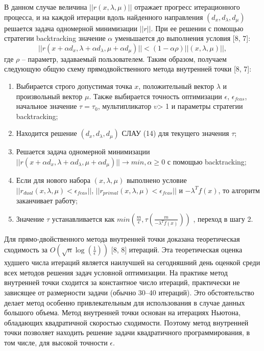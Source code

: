 \documentclass[12pt,a4paper]{article}
\begin{document}
В данном случае величина $||r(x, \lambda, \mu)||$ отражает прогресс итерационного процесса, и на каждой итерации вдоль найденного направления $(d_x, d_\lambda, d_\mu)$ решается задача одномерной минимизации $||r||$. При ее решении с помощью стратегии backtracking значение $\alpha$ уменьшается до выполнения условия [8, 7]:
	\begin{equation}
		||r(x+\alpha d_{x}, \lambda+\alpha d_{\lambda}, \mu+\alpha d_{\mu})|| < (1-\alpha  \rho)||(x,\lambda,\mu)||,
	\end{equation}		
где $\rho$ – параметр, задаваемый пользователем. Таким образом, получаем следующую общую схему прямодвойственного метода внутренней точки [8, 7]:
	\begin{enumerate}
		\item Выбирается строго допустимая точка $x$, положительный вектор $\lambda$ и произвольный вектор $\mu$. Также выбирается точность оптимизации $\epsilon$, $\epsilon_{feas}$, начальное значение $\tau=\tau_0$, мультипликатор $\upsilon$> 1 и параметры
		стратегии backtracking;
		\item Находится решение $(d_x, d_\lambda, d_\mu)$ СЛАУ (14) для текущего значения $\tau$;
		\item Решается задача одномерной минимизации $	||r(x + \alpha d_x, \lambda +\alpha d_\lambda, \mu + \alpha d_\mu)|| \longrightarrow min, \alpha \geq 0$	с помощью backtracking;
		\item  Если для нового набора $(x, \lambda, \mu)$ выполнено условие $||r_{dual} (x, \lambda, \mu) < \epsilon_{feas}||$, $||r_{primal} (x, \lambda, \mu) < \epsilon_{feas}||$ и $-\lambda^Tf(x)$, то алгоритм заканчивает работу;
		\item Значение $\tau$ устанавливается как $min(\frac{m}{\epsilon}, \tau(\frac{m}{-\lambda^{T}f(x)}))$
		, переход в шагу 2.
	\end{enumerate}
	
Для прямо-двойственного метода внутренней точки доказана теоретическая сходимость за \textbf{$O(\sqrt{n}\log(\frac{1}{\epsilon}))$} [8, 8]
итераций. Эта теоретическая оценка худшего числа итераций является наилучшей на сегодняшний день оценкой
среди всех методов решения задач условной оптимизации. На практике метод внутренней точки сходится за
константное число итераций, практически не зависящее от размерности задачи (обычно 30–40 итераций). Это
обстоятельство делает метод особенно привлекательным для использования в случае данных большого объема.
Метод внутренней точки основан на итерациях Ньютона, обладающих квадратичной скоростью сходимости.
Поэтому метод внутренней точки позволяет находить решение задачи квадратичного программирования, в том числе, для высокой точности $\epsilon$.
\end{document}
